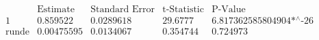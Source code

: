 \[\begin{array}{l|llll}
 \text{} & \text{Estimate} & \text{Standard Error} & \text{t-Statistic} & \text{P-Value} \\
\hline
 1 & 0.859522 & 0.0289618 & 29.6777 & \text{6.817362585804904$\grave{ }$*${}^{\wedge}$-26} \\
 \text{runde} & 0.00475595 & 0.0134067 & 0.354744 & 0.724973 \\
\end{array}\]

